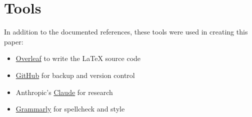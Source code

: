 %
%

\pagebreak
\section{Tools}

\onehalfspacing

In addition to the documented references, these tools were used in creating this paper:

\begin{itemize}
    \item \href{http://www.overleaf.com}{Overleaf} to write the LaTeX source code
    \item \href{https://github.com/chfrank-cgn}{GitHub} for backup and version control
    \item Anthropic's \href{https://www.anthropic.com/claude}{Claude} for research
    \item \href{https://app.grammarly.com/}{Grammarly} for spellcheck and style
\end{itemize}

